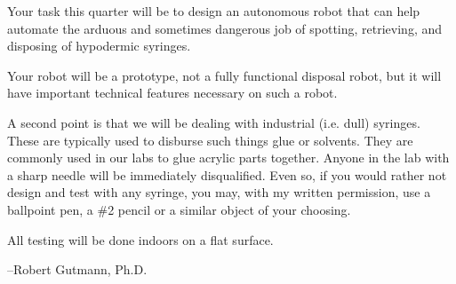 Your task this quarter will be to design an autonomous robot that can help automate the arduous and sometimes dangerous job of spotting, retrieving, and disposing of hypodermic syringes.

Your robot will be a prototype, not a fully functional disposal robot, but it will have important technical features necessary on such a robot.

A second point is that we will be dealing with industrial (i.\+e. dull) syringes. These are typically used to disburse such things glue or solvents. They are commonly used in our labs to glue acrylic parts together. Anyone in the lab with a sharp needle will be immediately disqualified. Even so, if you would rather not design and test with any syringe, you may, with my written permission, use a ballpoint pen, a \#2 pencil or a similar object of your choosing.

All testing will be done indoors on a flat surface.

--Robert Gutmann, Ph.\+D. 
